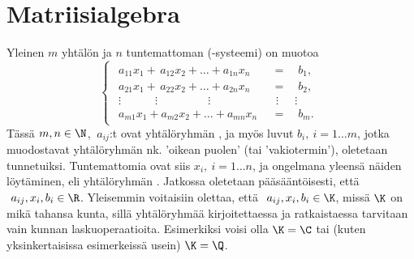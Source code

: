 \section{Matriisialgebra} \label{matriisialgebra}
\alku
{}

Yleinen $m$ yhtälön ja $n$ tuntemattoman  (-systeemi) on muotoa
\begin{equation} \label{m.1.1}
\begin{cases}
\begin{aligned}
a_{11} x_1 + \,a_{12} x_2 + \ldots + a_{1n} x_n \quad             &= \quad b_1, \\
a_{21} x_1 + \,a_{22} x_2 + \ldots + a_{2n} x_n \quad             &= \quad b_2, \\
\vdots \qquad\quad \vdots \ \ \qquad\quad\quad \vdots \qquad\quad &\ \,\vdots \quad\ \ \vdots \\
a_{m1} x_1 + a_{m2} x_2 + \ldots + a_{mn} x_n \ \               &= \quad b_m.
\end{aligned}
\end{cases}
\end{equation}
%
Tässä $m,n \in \N$, $\ a_{ij}$:t ovat yhtälöryhmän , ja myös luvut 
$b_i,\ i = 1 \ldots m$, jotka muodostavat yhtälöryhmän nk. 'oikean puolen' (tai 'vakiotermin'),
oletetaan tunnetuiksi. Tuntemattomia ovat siis $x_i,\ i = 1 \ldots n$, ja ongelmana yleensä
näiden löytäminen, eli yhtälöryhmän . Jatkossa oletetaan pääsääntöisesti, 
että $\ a_{ij}, x_i, b_i \in \R$. Yleisemmin voitaisiin olettaa, että 
$\ a_{ij}, x_i, b_i \in \K$, missä $\K$ on mikä tahansa kunta, sillä yhtälöryhmää 
kirjoitettaessa ja ratkaistaessa tarvitaan vain kunnan laskuoperaatioita. Esimerkiksi voisi olla 
$\K = \C$ tai (kuten yksinkertaisissa esimerkeissä usein) $\K = \Q$.

